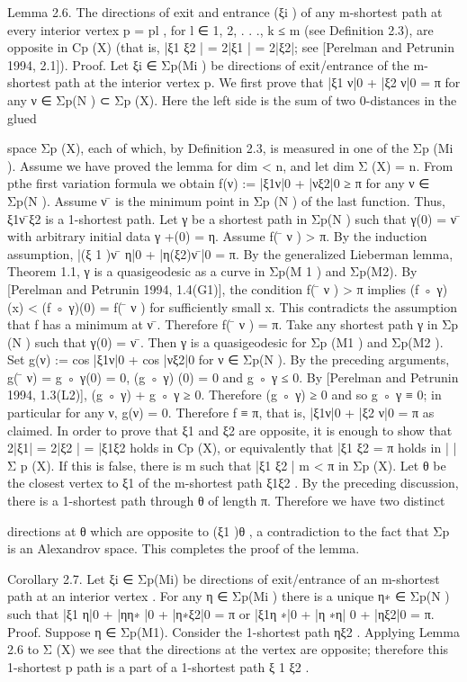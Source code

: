 Lemma 2.6. The directions of exit and entrance (ξi ) of any m-shortest path at
every interior vertex p = pl , for l ∈ {1, 2, . . ., k ≤ m} (see Definition 2.3), are
opposite in Cp (X) (that is, |ξ1 ξ2 | = 2|ξ1 | = 2|ξ2|; see [Perelman and Petrunin
1994, 2.1]).
Proof. Let ξi ∈ Σp(Mi ) be directions of exit/entrance of the m-shortest path
at the interior vertex p. We first prove that |ξ1 ν|0 + |ξ2 ν|0 = π for any ν ∈
Σp(N ) ⊂ Σp 
(X). Here the left side is the sum of two 0-distances in the glued

space Σp (X), each of which, by Definition 2.3, is measured in one of the Σp (Mi ).
Assume we have proved the lemma for dim < n, and let dim Σ
 (X) = n. From
pthe first variation formula we obtain
f(ν) := |ξ1ν|0 + |νξ2|0 ≥ π
for any ν ∈ Σp(N ). Assume ν  ̄ is the minimum point in Σp (N ) of the last
function. Thus, ξ1ν  ̄ξ2 is a 1-shortest path. Let γ be a shortest path in Σp(N )
such that γ(0) = ν  ̄ with arbitrary initial data γ +(0) = η. Assume f( ̄
 ν ) > π.
By the induction assumption, |(ξ 1 )ν  ̄ η|0 + |η(ξ2)ν  ̄|0 = π. By the generalized
Lieberman lemma, Theorem 1.1, γ is a quasigeodesic as a curve in Σp(M 1 ) and
Σp(M2). By [Perelman and Petrunin 1994, 1.4(G1)], the condition f( ̄
 ν ) > π
implies (f ◦ γ)(x) < (f ◦ γ)(0) = f( ̄
 ν ) for sufficiently small x. This contradicts
the assumption that f has a minimum at ν  ̄.
Therefore f( ̄
 ν ) = π. Take any shortest path γ in Σp (N ) such that γ(0) = ν  ̄.
Then γ is a quasigeodesic for Σp (M1 ) and Σp(M2 ). Set
g(ν) := cos |ξ1ν|0 + cos |νξ2|0
for ν ∈ Σp(N ). By the preceding arguments, g( ̄
 ν) = g ◦ γ(0) = 0, (g ◦ γ) (0) = 0
and g ◦ γ ≤ 0. By [Perelman and Petrunin 1994, 1.3(L2)], (g ◦ γ) + g ◦ γ ≥ 0.
Therefore (g ◦ γ) ≥ 0 and so g ◦ γ ≡ 0; in particular for any ν, g(ν) = 0.
Therefore f ≡ π, that is, |ξ1ν|0 + |ξ2 ν|0 = π as claimed.
In order to prove that ξ1 and ξ2 are opposite, it is enough to show that
2|ξ1| = 2|ξ2 | = |ξ1ξ2 holds in Cp (X), or equivalently that |ξ1 ξ2 = π holds in
| |Σ
 p (X). If this is false, there is m such that |ξ1 ξ2 | m < π in Σp 
 (X). Let θ be the
closest vertex to ξ1 of the m-shortest path ξ1ξ2 . By the preceding discussion,
there is a 1-shortest path through θ of length π. Therefore we have two distinct

directions at θ which are opposite to (ξ1 )θ , a contradiction to the fact that Σp
is an Alexandrov space. This completes the proof of the lemma.

Corollary 2.7. Let ξi ∈ Σp(Mi) be directions of exit/entrance of an m-shortest
path at an interior vertex . For any η ∈ Σp(Mi ) there is a unique η∗ ∈ Σp(N )
such that
|ξ1 η|0 + |ηη∗ |0 + |η∗ξ2|0 = π
or
|ξ1η ∗|0 + |η ∗η| 0 + |ηξ2|0 = π.
Proof. Suppose η ∈ Σp(M1). Consider the 1-shortest path ηξ2 . Applying
Lemma 2.6 to Σ
 (X) we see that the directions at the vertex are opposite;
therefore this 1-shortest p path is a part of a 1-shortest path ξ 1 ξ2 .


